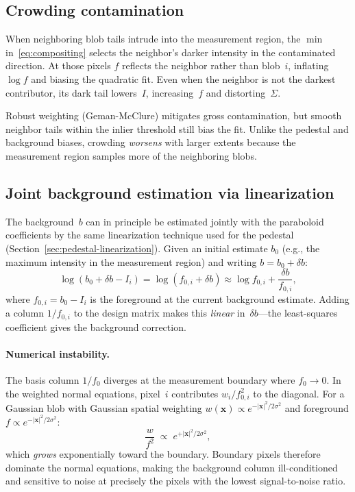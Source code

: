 \documentclass[11pt]{article}
\begin{document}
\subsection{Crowding contamination}

When neighboring blob tails intrude into the measurement region, the
$\min$ in~\eqref{eq:compositing} selects the neighbor's darker intensity
in the contaminated direction.  At those pixels $f$ reflects the
neighbor rather than blob~$i$, inflating $\log f$ and biasing the
quadratic fit.  Even when the neighbor is not the darkest contributor,
its dark tail lowers~$I$, increasing~$f$ and distorting~$\Sigma$.

Robust weighting (Geman-McClure) mitigates gross contamination, but
smooth neighbor tails within the inlier threshold still bias the fit.
Unlike the pedestal and background biases, crowding \emph{worsens} with
larger extents because the measurement region samples more of the
neighboring blobs.

\subsection{Joint background estimation via linearization}

The background~$b$ can in principle be estimated jointly with the
paraboloid coefficients by the same linearization technique used for
the pedestal (Section~\ref{sec:pedestal-linearization}).  Given an
initial estimate $b_0$ (e.g., the maximum intensity in the measurement
region) and writing $b = b_0 + \delta b$:
\begin{equation}
  \log(b_0 + \delta b - I_i)
    = \log(f_{0,i} + \delta b)
    \approx \log f_{0,i} + \frac{\delta b}{f_{0,i}},
  \label{eq:bg-linearization}
\end{equation}
where $f_{0,i} = b_0 - I_i$ is the foreground at the current
background estimate.  Adding a column $1/f_{0,i}$ to the design matrix
makes this \emph{linear} in~$\delta b$---the least-squares coefficient
gives the background correction.

\paragraph{Numerical instability.}
The basis column $1/f_0$ diverges at the measurement boundary where
$f_0 \to 0$.  In the weighted normal equations, pixel~$i$ contributes
$w_i / f_{0,i}^2$ to the diagonal.  For a Gaussian blob with Gaussian
spatial weighting $w(\mathbf{x}) \propto e^{-|\mathbf{x}|^2/2\sigma^2}$
and foreground $f \propto e^{-|\mathbf{x}|^2/2\sigma^2}$:
\begin{equation}
  \frac{w}{f^2} \;\propto\; e^{+|\mathbf{x}|^2 / 2\sigma^2},
\end{equation}
which \emph{grows} exponentially toward the boundary.  Boundary pixels
therefore dominate the normal equations, making the background column
ill-conditioned and sensitive to noise at precisely the pixels with the
lowest signal-to-noise ratio.
\end{document}
